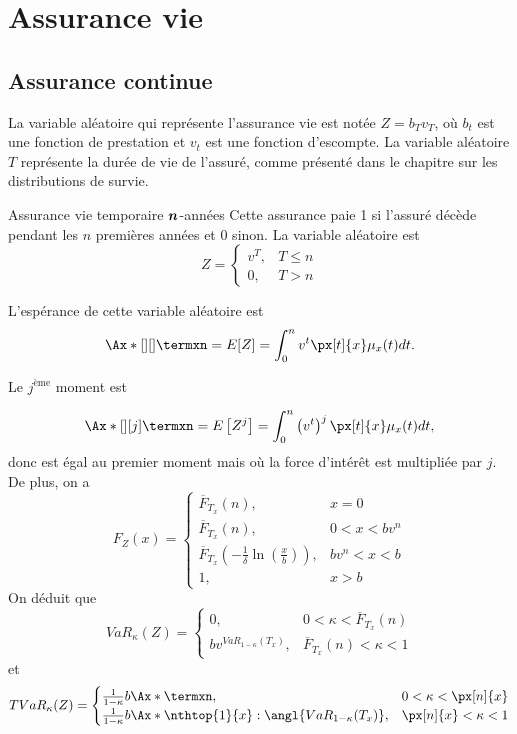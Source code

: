 \chapter{Assurance vie}

\section{Assurance continue}

La variable aléatoire qui représente l'assurance vie est notée $Z = b_T v_T$, où $b_t$ est une fonction de prestation et $v_t$ est une fonction d'escompte. La variable aléatoire $T$ représente la durée de vie de l'assuré, comme présenté dans le chapitre sur les distributions de survie. 

\begin{definition}{Assurance vie temporaire $\displaystyle \boldsymbol{n}$-années}{}
	Cette assurance paie 1 si l'assuré décède pendant les $n$ premières années et 0 sinon. La variable aléatoire est
	$$Z = \begin{cases}
	v^T,& T\leq n\\
	0,& T>n
	\end{cases}$$
	
	L'espérance de cette variable aléatoire est  
	$$\Ax*[][]{\termxn} = E[Z] = \int_{0}^{n}v^t \px[t]{x}\mu_x(t) dt.$$
	
	Le $j^{\text{ème}}$ moment est
	
	$$\Ax*[][j]{\termxn} = E\left[Z^j\right] = \int_{0}^{n}\left(v^t\right)^j \px[t]{x}\mu_x(t) dt,$$
	donc est égal au premier moment mais où la force d'intérêt est multipliée par $j$. De plus, on a 
	$$F_{Z}(x) = \begin{cases}
	\overline{F}_{T_x}(n),& x = 0\\
	\overline{F}_{T_x}(n),& 0<x<bv^n\\
	\overline{F}_{T_x}\left(-\frac{1}{\delta}\ln \left(\frac{x}{b}\right)\right),& bv^n<x<b\\
	1,& x>b
	\end{cases}$$
	On déduit que 
	$$VaR_\kappa(Z) = \begin{cases}
	0,& 0<\kappa < \overline{F}_{T_x}(n)\\
	bv^{VaR_{1-\kappa}(T_x)},& \overline{F}_{T_x}(n)<\kappa<1
	\end{cases}$$
	et
	$$TVaR_{\kappa}(Z) = \begin{cases}
	\frac{1}{1 - \kappa}b\Ax*{\termxn},& 0<\kappa < \px[n]{x}\\
	\frac{1}{1 - \kappa}b\Ax*{\nthtop{1}{x}:\angl{VaR_{1-\kappa}(T_x)}},& \px[n]{x}<\kappa<1\\
	\end{cases}$$
\end{definition}

